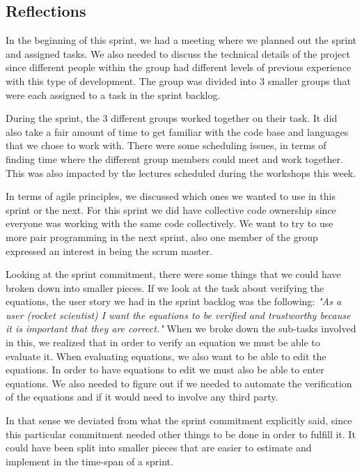 \documentclass[14]{article}
\begin{document}
\subsection{Reflections}

In the beginning of this sprint, we had a meeting where we planned out the sprint and assigned tasks. We also needed to discuss the technical details of the project since different people within the group had different levels of previous experience with this type of development. The group was divided into 3 smaller groups that were each assigned to a task in the sprint backlog.

During the sprint,  the 3 different groups worked together on their task. It did also take a fair amount of time to get familiar with the code base and languages that we chose to work with. There were some scheduling issues, in terms of finding time where the different group members could meet and work together. This was also impacted by the lectures scheduled during the workshops this week.

In terms of agile principles, we discussed which ones we wanted to use in this sprint or the next. For this sprint we did have collective code ownership since everyone was working with the same code collectively. We want to try to use more pair programming in the next sprint, also one member of the group expressed an interest in being the scrum master. 

Looking at the sprint commitment, there were some things that we could have broken down into smaller pieces. If we look at the task about verifying the equations, the user story we had in the sprint backlog was the following: \textit{"As a user (rocket scientist) I want the equations to be verified and trustworthy because it is important that they are correct."} When we broke down the sub-tasks involved in this, we realized that in order to verify an equation we must be able to evaluate it. When evaluating equations, we also want to be able to edit the equations. In order to have equations to edit we must also be able to enter equations. We also needed to figure out if we needed to automate the verification of the equations and if it would need to involve any third party. 

In that sense we deviated from what the sprint commitment explicitly said, since this particular commitment needed other things to be done in order to fulfill it. It could have been split into smaller pieces that are easier to estimate and implement in the time-span of a sprint.
\end{document}
